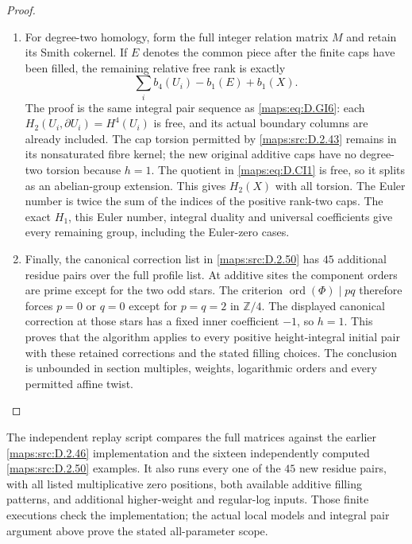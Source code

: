 \begin{proof}
\begin{enumerate}[label=\arabic*.,leftmargin=*]
\item For degree-two homology, form the full integer
relation matrix $M$ and retain its Smith cokernel.
If $E$ denotes the common piece after the finite
caps have been filled, the remaining relative
free rank is exactly
\[
           \sum_i b_4(U_i)-b_1(E)+b_1(X).
                                                        \tag{D.CI1}\label{maps:eq:D.CI1}
\]
The proof is the same integral pair sequence as
\eqref{maps:eq:D.GI6}: each $H_2(U_i,\partial U_i)=H^4(U_i)$
is free, and its actual boundary columns are
already included. The cap torsion permitted by
\ref{maps:src:D.2.43} remains in its nonsaturated fibre kernel;
the new original additive caps have no degree-two
torsion because $h=1$. The quotient in \eqref{maps:eq:D.CI1}
is free, so it splits as an abelian-group extension.
This gives $H_2(X)$ with all torsion.
The Euler number is twice the sum of the indices
of the positive rank-two caps. The exact $H_1$,
this Euler number, integral duality and universal
coefficients give every remaining group, including
the Euler-zero cases.

\item Finally, the canonical correction list in \ref{maps:src:D.2.50}
has $45$ additional residue pairs over the full
profile list. At additive sites the component
orders are prime except for the two odd stars.
The criterion $\operatorname{ord}(\Phi)\mid pq$
therefore forces $p=0$ or $q=0$ except for
$p=q=2$ in $\mathbb Z/4$.
The displayed canonical correction at those
stars has a fixed inner coefficient $-1$,
so $h=1$. This proves that the algorithm applies
to every positive height-integral initial pair
with these retained corrections and the stated
filling choices. The conclusion is unbounded in
section multiples, weights, logarithmic orders
and every permitted affine twist.
\end{enumerate}
\end{proof}

The independent replay script
compares the full matrices against the earlier
\ref{maps:src:D.2.46} implementation and the sixteen independently
computed \ref{maps:src:D.2.50} examples. It also runs every one
of the $45$ new residue pairs, with all listed
multiplicative zero positions, both available
additive filling patterns, and additional
higher-weight and regular-log inputs.
Those finite executions check the implementation;
the actual local models and integral pair argument
above prove the stated all-parameter scope.


